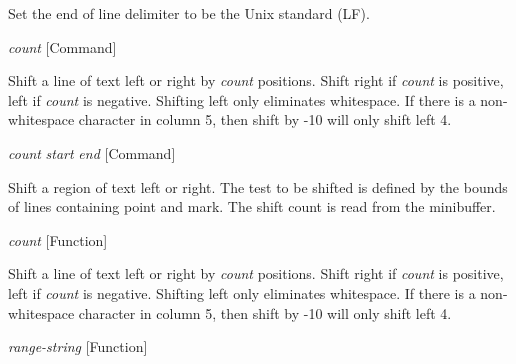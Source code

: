 \begin{doc-string}
Set the end of line delimiter to be the Unix standard (LF).
\end{doc-string}

\vspace{1em}
\noindent
{}
\usebox{\funcname}\emph{count}
 \hfill [Command]

\begin{doc-string}
Shift a line of text left or right by \emph{count} positions.  Shift right
if \emph{count} is positive, left if \emph{count} is negative.  Shifting left only
eliminates whitespace.  If there is a non-whitespace character in column
5, then shift by -10 will only shift left 4.
\end{doc-string}

\vspace{1em}
\noindent
{}
\usebox{\funcname}\emph{count} \emph{start} \emph{end}
 \hfill [Command]

\begin{doc-string}
Shift a region of text left or right.  The test to be shifted is defined
by the bounds of lines containing point and mark.  The shift count is
read from the minibuffer.
\end{doc-string}

\vspace{1em}
\noindent
{}
\usebox{\funcname}\emph{count}
 \hfill [Function]

\begin{doc-string}
Shift a line of text left or right by \emph{count} positions.  Shift right
if \emph{count} is positive, left if \emph{count} is negative.  Shifting left only
eliminates whitespace.  If there is a non-whitespace character in column
5, then shift by -10 will only shift left 4.
\end{doc-string}

\vspace{1em}
\noindent
{}
\usebox{\funcname}\emph{range-string}
 \hfill [Function]

